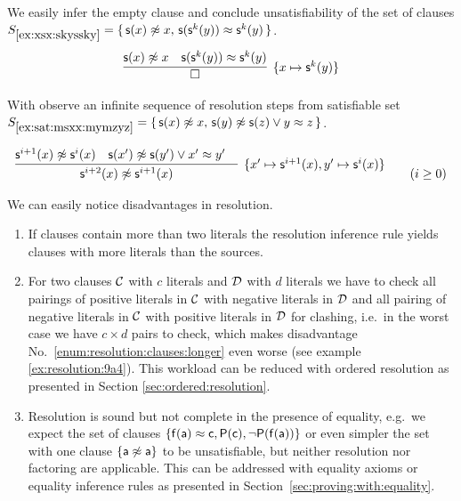 \begin{example}\label{ex:xsx:skyssky}
	We easily infer the empty clause and
	conclude unsatisfiability of the set of clauses
	$S_{\ref{ex:xsx:skyssky}} = \{\,
	{ \mathsf{s}(x)\not\approx x},\,
	{ \mathsf{s}(\mathsf{s}^k(y))\approx\mathsf{s}^k(y) }
	\,\}$.
	\begin{gather*}
	\infer[\{ x\mapsto\msucc^k(y) \}]
	{
		\square
	}
	{
		\msucc(x)\mNE x & \msucc(\msucc^k(y))\mEQ\msucc^k(y)
	}
	\end{gather*}
\end{example}

\begin{example}\label{ex:sat:msxx:mymzyz}
	With observe an infinite sequence of resolution steps from satisfiable set
	$S_{\ref{ex:sat:msxx:mymzyz}} = \{\, \mathsf{s}(x)\not\approx x,\, \mathsf{s}(y)\not\approx\mathsf{s}(z) \lor y\approx z
	\,\}$.

	\begin{gather*}
	\infer
	[\{ x'\mapsto\msucc^{i+1}(x), y'\mapsto\msucc^{i}(x)\}]
	{
		\msucc^{i+2}(x) \mNE\msucc^{i+1}(x)
	}{
		\msucc^{i+1}(x)\mNE \msucc^i(x) & \msucc(x')\mNE\msucc(y')\lor x'\mEQ y'
		&
	}
	\tag{\(i\geq 0\)}
	\end{gather*}
\end{example}



We can easily notice disadvantages in resolution.

\begin{enumerate}
	\item\label{enum:resolution:clauses:longer}
	If clauses contain more than two literals the resolution inference rule
	yields clauses with more literals than the sources.

	\item\label{enum:resolution:clauses:multiple}
	For two clauses \(\mathcal{C}\) with \(c\) literals and \(\mathcal{D}\) with \(d\) literals
	we have to check all pairings
	of positive literals in \(\mathcal{C}\)
	with negative literals in \(\mathcal{D}\)
	and all pairing of negative literals in \(\mathcal{C}\)
	with positive literals in \(\mathcal{D}\) for clashing,
	i.e.~in the worst case we have \(c\times d\) pairs to check,
	which makes disadvantage No.~\ref{enum:resolution:clauses:longer} even worse
	(see example \ref{ex:resolution:9a4}).
	This workload can be reduced with ordered resolution as presented in Section
	\ref{sec:ordered:resolution}.

	\item Resolution is sound but not complete in the presence of equality,
	e.g.~we expect the set of clauses
	\( \{ \mathsf{f}(\mathsf{a}) \approx \mathsf{c}, \mathsf{P}(\mathsf{c}), \lnot\mathsf{P}(\mathsf{f}(\mathsf{a})) \} \)
	or even simpler the set with one clause
	\(\{ \mathsf{a}\not\approx\mathsf{a} \} \)
	to be unsatisfiable, but neither resolution nor factoring
	are applicable. This can be addressed with equality axioms or equality inference rules
	as presented in Section~\ref{sec:proving:with:equality}.
\end{enumerate}

